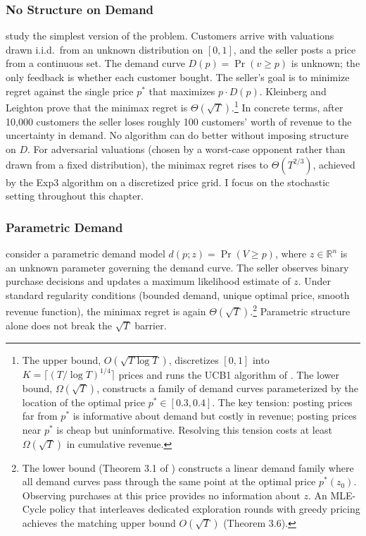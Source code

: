 \subsubsection{No Structure on Demand}
\label{sec:kleinberg}

\citet{Kleinberg2003} study the simplest version of the problem. Customers arrive with valuations drawn i.i.d.\ from an unknown distribution on $[0,1]$, and the seller posts a price from a continuous set. The demand curve $D(p) = \Pr(v \geq p)$ is unknown; the only feedback is whether each customer bought. The seller's goal is to minimize regret against the single price $p^*$ that maximizes $p \cdot D(p)$. Kleinberg and Leighton prove that the minimax regret is $\Theta(\sqrt{T})$.\footnote{The upper bound, $O(\sqrt{T \log T})$, discretizes $[0,1]$ into $K = \lceil (T/\log T)^{1/4} \rceil$ prices and runs the UCB1 algorithm of \citet{auer2002}. The lower bound, $\Omega(\sqrt{T})$, constructs a family of demand curves parameterized by the location of the optimal price $p^* \in [0.3, 0.4]$. The key tension: posting prices far from $p^*$ is informative about demand but costly in revenue; posting prices near $p^*$ is cheap but uninformative. Resolving this tension costs at least $\Omega(\sqrt{T})$ in cumulative revenue.} In concrete terms, after 10,000 customers the seller loses roughly 100 customers' worth of revenue to the uncertainty in demand. No algorithm can do better without imposing structure on $D$. For adversarial valuations (chosen by a worst-case opponent rather than drawn from a fixed distribution), the minimax regret rises to $\Theta(T^{2/3})$, achieved by the Exp3 algorithm on a discretized price grid. I focus on the stochastic setting throughout this chapter.

\subsubsection{Parametric Demand}
\label{sec:broder}

\citet{Broder2012} consider a parametric demand model $d(p; z) = \Pr(V \geq p)$, where $z \in \mathbb{R}^n$ is an unknown parameter governing the demand curve. The seller observes binary purchase decisions and updates a maximum likelihood estimate of $z$. Under standard regularity conditions (bounded demand, unique optimal price, smooth revenue function), the minimax regret is again $\Theta(\sqrt{T})$.\footnote{The lower bound (Theorem 3.1 of \citet{Broder2012}) constructs a linear demand family where all demand curves pass through the same point at the optimal price $p^*(z_0)$. Observing purchases at this price provides no information about $z$. An MLE-Cycle policy that interleaves dedicated exploration rounds with greedy pricing achieves the matching upper bound $O(\sqrt{T})$ (Theorem 3.6).} Parametric structure alone does not break the $\sqrt{T}$ barrier.

